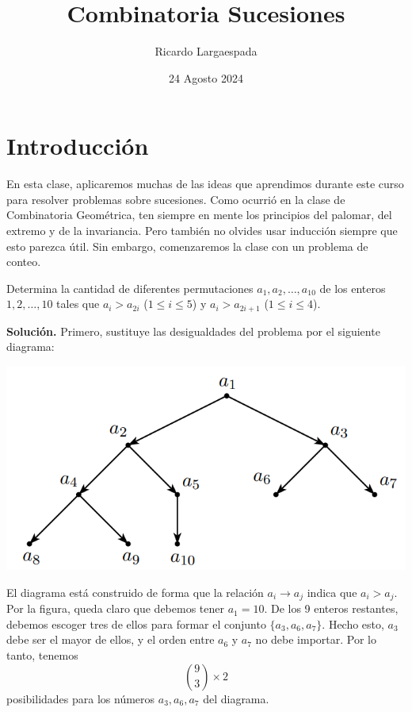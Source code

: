 \documentclass[11pt]{scrartcl}
\begin{document}
\title{Combinatoria Sucesiones}
\author{Ricardo Largaespada}
\date{24 Agosto 2024}

\maketitle

\section{Introducción}

En esta clase, aplicaremos muchas de las ideas que aprendimos durante este curso para resolver problemas sobre sucesiones. Como ocurrió en la clase de Combinatoria Geométrica, ten siempre en mente los principios del palomar, del extremo y de la invariancia. Pero también no olvides usar inducción siempre que esto parezca útil. Sin embargo, comenzaremos la clase con un problema de conteo.

\begin{example}
Determina la cantidad de diferentes permutaciones $a_1, a_2, \dots, a_{10}$ de los enteros $1, 2, \dots, 10$ tales que $a_i > a_{2i}$ ($1 \leq i \leq 5$) y $a_i > a_{2i+1}$ ($1 \leq i \leq 4$).
\end{example}
\textbf{Solución.} Primero, sustituye las desigualdades del problema por el siguiente diagrama:
\begin{center}
    \includegraphics[scale=.75]{images/clase_14-orden-secuencia.png}
\end{center}

El diagrama está construido de forma que la relación $a_i \rightarrow a_j$ indica que $a_i > a_j$. Por la figura, queda claro que debemos tener $a_1 = 10$. De los 9 enteros restantes, debemos escoger tres de ellos para formar el conjunto $\{a_3, a_6, a_7\}$. Hecho esto, $a_3$ debe ser el mayor de ellos, y el orden entre $a_6$ y $a_7$ no debe importar. Por lo tanto, tenemos 
\[
\binom{9}{3} \times 2
\]
posibilidades para los números $a_3, a_6, a_7$ del diagrama.
\end{document}
